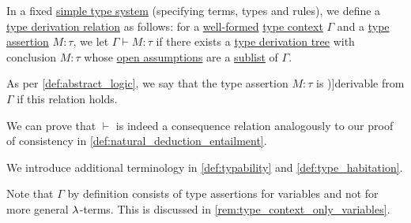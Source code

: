 \begin{definition}\label{def:simple_type_derivability}\mimprovised
  In a fixed \hyperref[def:simple_type_system]{simple type system} (specifying terms, types and rules), we define a \hyperref[def:type_derivation_relation]{type derivation relation} as follows: for a \hyperref[rem:well_formed_context]{well-formed} \hyperref[def:type_context]{type context} \( \Gamma \) and a \hyperref[def:type_assertion]{type assertion} \( M: \tau \), we let \( \Gamma \vdash M: \tau \) if there exists a \hyperref[def:type_derivation_tree]{type derivation tree} with conclusion \( M: \tau \) whose \hyperref[def:type_derivation_tree/open]{open assumptions} are a \hyperref[def:subsequence]{sublist} of \( \Gamma \).

  As per \cref{def:abstract_logic}, we say that the type assertion \( M: \tau \) is \term[en=derivable (\cite[def. 3.1.4]{Barendregt1992LambdaCalculiWithTypes})]{derivable} from \( \Gamma \) if this relation holds.
\end{definition}
\begin{defproof}
  We can prove that \( {\vdash} \) is indeed a consequence relation analogously to our proof of consistency in \cref{def:natural_deduction_entailment}.
\end{defproof}
\begin{comments}
  \item We introduce additional terminology in \cref{def:typability} and \cref{def:type_habitation}.

  \item Note that \( \Gamma \) by definition consists of type assertions for variables and not for more general \( {\mathrm \lambda} \)-terms. This is discussed in \cref{rem:type_context_only_variables}.
\end{comments}

